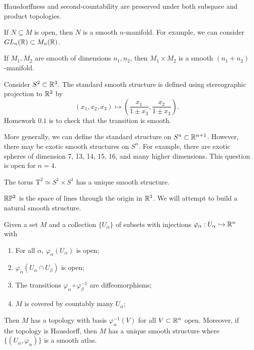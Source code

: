 \documentclass[twoside, 10pt]{article}
\begin{document}
    \begin{rmk} Hausdorffness and second-countability are preserved under both
    subspace and product topologies.  \end{rmk}

    \begin{exm} If $N \subseteq M$ is open, then $N$ is a smooth $n$-manifold.
    For example, we can consider $GL_n(\mathbb{R}) \subset M_n(\mathbb{R})$.  \end{exm}

    \begin{exm} If $M_1,M_2$ are smooth of dimensions $n_1, n_2$, then $M_1
    \times M_2$ is a smooth $(n_1+n_2)$-manifold.  \end{exm}

    \begin{exm} Consider $S^2 \subset \mathbb{R}^3$. The standard smooth structure is
        defined using stereographic projection to $\mathbb{R}^2$ by \[(x_1,x_2,x_3)
        \mapsto \left(\frac{x_1}{1\pm x_3}, \frac{x_2}{ 1 \pm x_3 }\right).\]
        Homework $0.1$ is to check that the transition is smooth.  \end{exm}

    More generally, we can define the standard structure on $S^n \subset
    \mathbb{R}^{n+1}$. However, there may be exotic smooth structures on $S^n$. For
    example, there are exotic spheres of dimension 7, 13, 14, 15, 16, and many
    higher dimensions. This question is open for $n = 4$.

    \begin{exm} The torus $\mathrm{T}^2 \simeq S^1\times S^1$ has a unique
    smooth structure.  \end{exm}

    \begin{exm} $\mathbb{R}\mathbb{P}^2$ is the space of lines through the origin in $\mathbb{R}^3$. We
    will attempt to build a natural smooth structure.  \end{exm}

    \begin{lem} Given a set $M$ and a collection $\{U_{\alpha}\}$ of subsets
        with injections $\varphi_{\alpha}: U_{\alpha} \hookrightarrow \mathbb{R}^n$
        with \begin{enumerate} \item For all $\alpha$,
            $\varphi_{\alpha}(U_{\alpha})$ is open; \item
            $\varphi_{\alpha}(U_{\alpha} \cap U_{\beta})$ is open; \item The
    transitions $\varphi_{\alpha} \circ \varphi_{\beta}^{-1}$ are
    diffeomorphisms; \item $M$ is covered by countably many $U_{\alpha}$;
    \end{enumerate} Then $M$ has a topology with basis
    $\varphi_{\alpha}^{-1}(V)$ for all $V \subset \mathbb{R}^n$ open. Moreover, if the
    topology is Hausdorff, then $M$ has a unique smooth structure where
    $\{(U_{\alpha}, \varphi_{\alpha})\}$ is a smooth atlas.  \end{lem}
\end{document}
